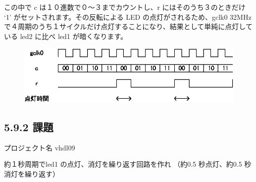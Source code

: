 \documentclass[letterpaper,10pt,dvipdfmx]{sphinxmanual}
\begin{document}
この中で c は１０進数で０～３までカウントし、r にはそのうち３のときだけ `1' がセットされます。その反転による LED の点灯がされるため、gclk0 32MHz で４周期のうち１サイクルだけ点灯することになり、結果として単純に点灯している led2 に比べ led1 が暗くなります。
\begin{figure}[htbp]
\centering

\includegraphics{figure17.eps}
\end{figure}


\subsection{5.9.2 課題}
\label{05_try:id16}
プロジェクト名 vhdl09

約１秒周期でled1 の点灯、消灯を繰り返す回路を作れ
（約0.5 秒点灯、約0.5 秒消灯を繰り返す）
\end{document}
